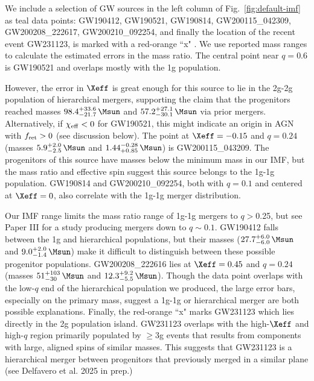 We include a selection of GW sources in the left column of Fig.~\ref{fig:default-imf} as teal data points: GW190412, GW190521, GW190814, GW200115\_042309, GW200208\_222617, GW200210\_092254, 
and finally the location of the recent event  GW231123, is marked with a red-orange ``x"
\citep{Abbott+20-GW190521astro,Abbott+20-GW190521,Abbott+23-O3b,Abbot+24:GWTC-2.1,LVK+25-GW231123}.
We use reported mass ranges to calculate the estimated errors in the mass ratio.
The central point near $q=0.6$ is GW190521 and overlaps mostly with the 1g population.

However, the error in $\Xeff$ is great enough for this source to lie in the 2g-2g population of hierarchical mergers, supporting the claim that the progenitors reached masses $98.4_{-21.7}^{+33.6}\,\Msun$ and $57.2_{-30.1}^{+27.1}\,\Msun$ via prior mergers.
Alternatively, if $\chi_{\rm eff}<0$ for GW190521, this might indicate an origin in AGN with $f_{\rm ret}>0$ (see discussion below).
The point at $\Xeff=-0.15$ and $q=0.24$ (masses $5.9_{-2.5}^{+2.0}\,\Msun$ and $1.44_{+0.85}^{-0.28}\,\Msun$) is GW200115\_043209.
The progenitors of this source have masses below the minimum mass in our IMF, but the mass ratio and effective spin suggest this source belongs to the 1g-1g population.
GW190814 and GW200210\_092254, both with $q=0.1$ and centered at $\Xeff=0$, also correlate with the 1g-1g merger distribution.

Our IMF range limits the mass ratio range of 1g-1g mergers to $q>$0.25, but see  Paper III for a study producing mergers down to $q \sim 0.1$.
GW190412 falls between the 1g and hierarchical populations, but their masses ($27.7_{-6.0}^{+6.0}\,\Msun$ and $9.0_{-1.4}^{+2.0}\,\Msun$) make it difficult to distinguish between these possible progenitor populations.
GW200208\_222616 lies at  $\Xeff=0.45$ and $q=0.24$ (masses $51_{-30}^{+103}\,\Msun$ and $12.3_{-5.5}^{+9.2}\,\Msun$).
Though the data point overlaps with the low-$q$ end of the hierarchical population we produced, the large error bars, especially on the primary mass, suggest a 1g-1g or hierarchical merger are both possible explanations.
Finally, the red-orange ``x" marks GW231123 \citep{LVK+25-GW231123} which lies directly in the 2g population island.
GW231123 overlaps with the high-$\Xeff$ and high-$q$ region primarily populated by $\geq$3g events that results from components with large, aligned spins of similar masses.
This suggests that GW231123 is a hierarchical merger between progenitors that previously merged in a similar plane (see Delfavero et al. 2025 in prep.)
 
